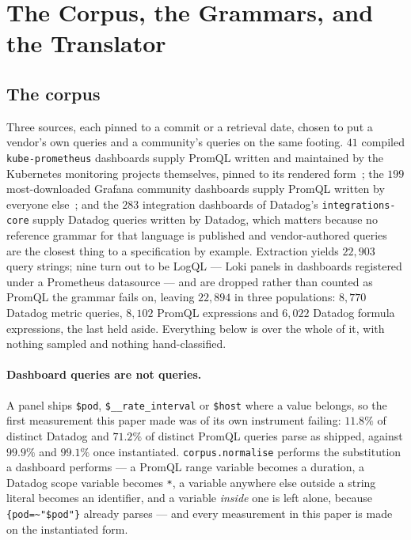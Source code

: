 
\section{The Corpus, the Grammars, and the Translator}
\label{s2:sec:translator}

\subsection{The corpus}
\label{s2:sec:corpus}

Three sources, each pinned to a commit or a retrieval date, chosen to put a vendor's own
queries and a community's queries on the same footing. $41$ compiled
\texttt{kube-prometheus} dashboards supply PromQL written and maintained by the Kubernetes
monitoring projects themselves, pinned to its rendered form~\citep{kubeprom,kubemixin};
the $199$ most-downloaded Grafana community dashboards supply PromQL written by everyone
else~\citep{grafanadash}; and the $283$ integration dashboards of Datadog's
\texttt{integrations-core} supply Datadog queries written by Datadog, which matters
because no reference grammar for that language is published and vendor-authored queries
are the closest thing to a specification by example. Extraction yields $22{,}903$ query
strings; nine turn out to be LogQL --- Loki panels in dashboards registered under a
Prometheus datasource --- and are dropped rather than counted as PromQL the grammar fails
on, leaving $22{,}894$ in three populations: $8{,}770$ Datadog metric queries, $8{,}102$
PromQL expressions and $6{,}022$ Datadog formula expressions, the last held aside.
Everything below is over the whole of it, with nothing sampled and nothing
hand-classified.

\paragraph{Dashboard queries are not queries.}
A panel ships \texttt{\$pod}, \texttt{\$\_\_rate\_interval} or \texttt{\$host} where a
value belongs, so the first measurement this paper made was of its own instrument failing:
$11.8\%$ of distinct Datadog and $71.2\%$ of distinct PromQL queries parse as shipped,
against $99.9\%$ and $99.1\%$ once instantiated.
\texttt{corpus.normalise} performs the substitution a dashboard performs --- a PromQL range
variable becomes a duration, a Datadog scope variable becomes \texttt{*}, a variable
anywhere else outside a string literal becomes an identifier, and a variable \emph{inside}
one is left alone, because \texttt{\{pod=\~{}"\$pod"\}} already parses --- and every
measurement in this paper is made on the instantiated form.

